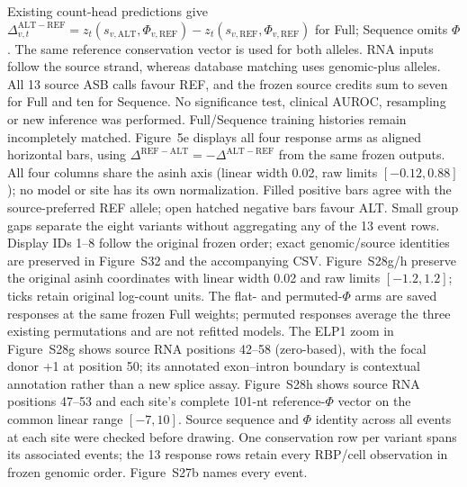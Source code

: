 Existing count-head predictions give $\Delta_{v,t}^{\mathrm{ALT-REF}}=z_t(s_{v,\mathrm{ALT}},\Phi_{v,\mathrm{REF}})-z_t(s_{v,\mathrm{REF}},\Phi_{v,\mathrm{REF}})$ for Full; Sequence omits $\Phi$. The same reference conservation vector is used for both alleles. RNA inputs follow the source strand, whereas database matching uses genomic-plus alleles. All 13 source ASB calls favour REF, and the frozen source credits sum to seven for Full and ten for Sequence. No significance test, clinical AUROC, resampling or new inference was performed. Full/Sequence training histories remain incompletely matched. Figure~5e displays all four response arms as aligned horizontal bars, using $\Delta^{\mathrm{REF-ALT}}=-\Delta^{\mathrm{ALT-REF}}$ from the same frozen outputs. All four columns share the asinh axis (linear width 0.02, raw limits $[-0.12,0.88]$); no model or site has its own normalization. Filled positive bars agree with the source-preferred REF allele; open hatched negative bars favour ALT. Small group gaps separate the eight variants without aggregating any of the 13 event rows. Display IDs 1--8 follow the original frozen order; exact genomic/source identities are preserved in Figure~S32 and the accompanying CSV. Figure~S28g/h preserve the original asinh coordinates with linear width 0.02 and raw limits $[-1.2,1.2]$; ticks retain original log-count units. The flat- and permuted-$\Phi$ arms are saved responses at the same frozen Full weights; permuted responses average the three existing permutations and are not refitted models. The ELP1 zoom in Figure~S28g shows source RNA positions 42--58 (zero-based), with the focal donor +1 at position 50; its annotated exon--intron boundary is contextual annotation rather than a new splice assay. Figure~S28h shows source RNA positions 47--53 and each site's complete 101-nt reference-$\Phi$ vector on the common linear range $[-7,10]$. Source sequence and $\Phi$ identity across all events at each site were checked before drawing. One conservation row per variant spans its associated events; the 13 response rows retain every RBP/cell observation in frozen genomic order. Figure~S27b names every event.

